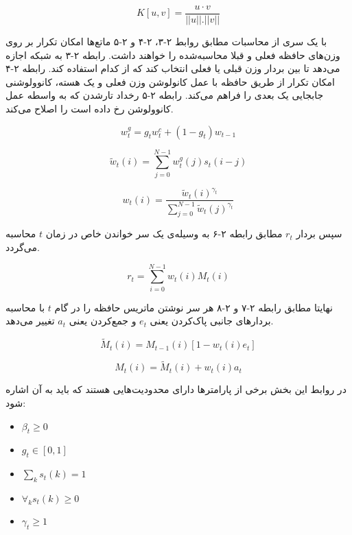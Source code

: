 \begin{equation}
K[u, v] = \frac{u·v}{||u||.||v||} 
\end{equation}

با یک سری از محاسبات مطابق روابط ۲-۳، ۲-۴ و ۲-۵ ماتع‌ها امکان تکرار بر روی وزن‌های حافظه فعلی و قبلا محاسبه‌شده را خواهند داشت. رابطه ۲-۳ به شبکه اجازه می‌دهد تا بین بردار وزن قبلی یا فعلی انتخاب کند که از کدام استفاده کند. رابطه ۲-۴ امکان تکرار از طریق حافظه با عمل کانولوشن وزن فعلی و یک هسته، کانوولوشنی جابجایی یک بعدی را فراهم می‌کند. رابطه ۲-۵ رخداد تارشدن که به واسطه عمل کانوولوشن رخ داده است را اصلاح می‌کند.\cite{collier2018implementing}


\begin{equation}
w^g_t = g_t w^c_t + (1 - g_t)w_{t-1}
\end{equation}

\begin{equation}
\tilde{w}_t(i) = \sum^{N-1}_{j=0} w^g_t(j)s_t(i - j)
\end{equation}

\begin{equation}
w_t(i) = \frac{\tilde{w}_t(i)^{\gamma_t}}{\sum_{j=0}^{N-1}\tilde{w}_t(j)^{\gamma_t}}
\end{equation}

سپس بردار $r_t$ مطابق رابطه ۲-۶ به وسیله‌ی یک سر خواندن خاص در زمان $t$ محاسبه می‌گردد.\cite{collier2018implementing}

\begin{equation}
r_t = \sum_{i=0}^{N-1} w_t(i)M_t(i)
\end{equation}

نهایتا مطابق رابطه ۲-۷ و ۲-۸ هر سر نوشتن ماتریس حافظه را در گام $t$ با محاسبه بردارهای جانبی پاک‌کردن یعنی $e_t$ و جمع‌‌کردن یعنی $a_t$ تغییر می‌دهد.\cite{collier2018implementing}

\begin{equation}
\tilde{M}_t(i) = M_{t-1}(i)[1-w_t(i)e_t]
\end{equation}

\begin{equation}
M_t(i) = \tilde{M}_t(i) + w_t(i)a_t
\end{equation}

در روابط این بخش برخی از پارامترها دارای محدودیت‌هایی هستند که باید به آن اشاره شود:\cite{collier2018implementing}
\begin{itemize}
\item $\beta_t \ge 0$
\item $g_t \in [0, 1]$
\item $\sum_k s_t(k) = 1$
\item $\forall_k s_t(k) \ge 0$
\item $\gamma_t \ge 1$
\end{itemize}


